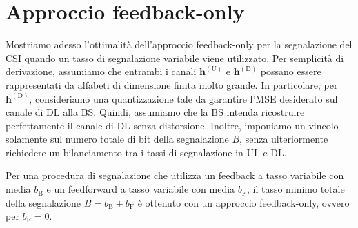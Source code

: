 \section{Approccio feedback-only}
\label{sec:feedback-only}

Mostriamo adesso l'ottimalità dell'approccio feedback-only per la
segnalazione del CSI quando un tasso di segnalazione variabile viene
utilizzato. Per semplicità di derivazione, assumiamo che entrambi i canali
\(\bm{h}^\mathrm{(U)}\) e \(\bm{h}^\mathrm{(D)}\) possano essere rappresentati
da alfabeti di dimensione finita molto grande. In particolare, per
\(\bm{h}^\mathrm{(D)}\), consideriamo una quantizzazione tale da garantire
l'MSE desiderato sul canale di DL alla BS. Quindi, assumiamo che la BS intenda
ricostruire perfettamente il canale di DL senza distorsione. Inoltre, imponiamo
un vincolo solamente sul numero totale di bit della segnalazione \(B\), senza
ulteriormente richiedere un bilanciamento tra i tassi di segnalazione in UL e
DL.

\begin{thm}
    \label{thm:feedback-only}

    Per una procedura di segnalazione che utilizza un feedback a tasso
    variabile con media \(b_\mathrm{B}\) e un feedforward a tasso variabile con
    media \(b_\mathrm{F}\), il tasso minimo totale della segnalazione \(B =
    b_\mathrm{B} + b_\mathrm{F}\) è ottenuto con un approccio feedback-only,
    ovvero per \(b_\mathrm{F} = 0\).
\end{thm}

